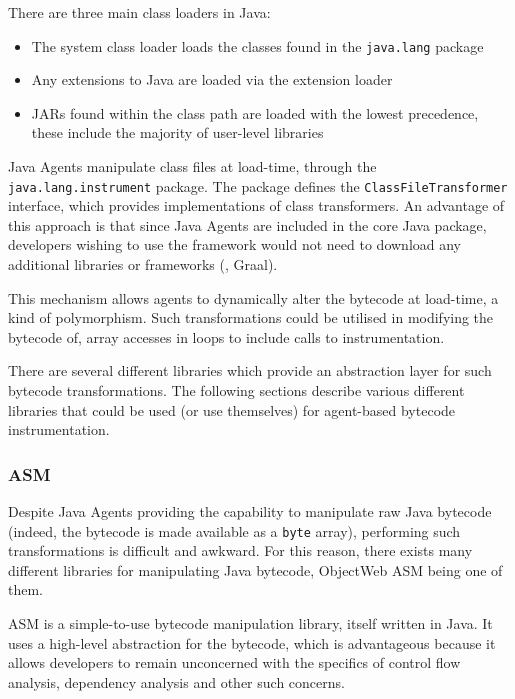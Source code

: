 	There are three main class loaders in Java:

	\begin{itemize}
		\item The system class loader loads the classes found in the \texttt{java.lang} package
		
		\item Any extensions to Java are loaded via the extension loader

		\item JARs found within the class path are loaded with the lowest precedence, these include the majority of user-level libraries
	\end{itemize}

	Java Agents manipulate class files at load-time, through the \texttt{java.lang.instrument} package. The package defines the \texttt{ClassFileTransformer} interface, which provides implementations of class transformers. An advantage of this approach is that since Java Agents are included in the core Java package, developers wishing to use the framework would not need to download any additional libraries or frameworks (\ie, Graal).
	
	This mechanism allows agents to dynamically alter the bytecode at load-time, a kind of polymorphism. Such transformations could be utilised in modifying the bytecode of, \eg array accesses in loops to include calls to instrumentation.

	There are several different libraries which provide an abstraction layer for such bytecode transformations. The following sections describe various different libraries that could be used (or use themselves) for agent-based bytecode instrumentation.

		\subsubsection{ASM} \label{sec:instrumentation/bytecode-instr/asm}
		Despite Java Agents providing the capability to manipulate raw Java bytecode (indeed, the bytecode is made available as a \texttt{byte} array), performing such transformations is difficult and awkward. For this reason, there exists many different libraries for manipulating Java bytecode, ObjectWeb ASM being one of them.

                ASM \citep{Bruneton2002} is a simple-to-use bytecode manipulation library, itself written in Java. It uses a high-level abstraction for the bytecode, which is advantageous because it allows developers to remain unconcerned with the specifics of control flow analysis, dependency analysis and other such concerns.

